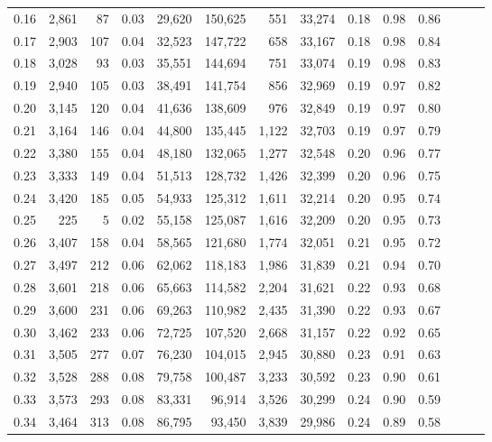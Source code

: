 \begin{tabular}{rrrrrrrrrrrrrr}
0.16 &  2,861 &   87 &  0.03 &   29,620 &  150,625 &     551 &  33,274 &  0.18 &  0.98 &      0.86 \\
0.17 &  2,903 &  107 &  0.04 &   32,523 &  147,722 &     658 &  33,167 &  0.18 &  0.98 &      0.84 \\
0.18 &  3,028 &   93 &  0.03 &   35,551 &  144,694 &     751 &  33,074 &  0.19 &  0.98 &      0.83 \\
0.19 &  2,940 &  105 &  0.03 &   38,491 &  141,754 &     856 &  32,969 &  0.19 &  0.97 &      0.82 \\
0.20 &  3,145 &  120 &  0.04 &   41,636 &  138,609 &     976 &  32,849 &  0.19 &  0.97 &      0.80 \\
0.21 &  3,164 &  146 &  0.04 &   44,800 &  135,445 &   1,122 &  32,703 &  0.19 &  0.97 &      0.79 \\
0.22 &  3,380 &  155 &  0.04 &   48,180 &  132,065 &   1,277 &  32,548 &  0.20 &  0.96 &      0.77 \\
0.23 &  3,333 &  149 &  0.04 &   51,513 &  128,732 &   1,426 &  32,399 &  0.20 &  0.96 &      0.75 \\
0.24 &  3,420 &  185 &  0.05 &   54,933 &  125,312 &   1,611 &  32,214 &  0.20 &  0.95 &      0.74 \\
0.25 &    225 &    5 &  0.02 &   55,158 &  125,087 &   1,616 &  32,209 &  0.20 &  0.95 &      0.73 \\
0.26 &  3,407 &  158 &  0.04 &   58,565 &  121,680 &   1,774 &  32,051 &  0.21 &  0.95 &      0.72 \\
0.27 &  3,497 &  212 &  0.06 &   62,062 &  118,183 &   1,986 &  31,839 &  0.21 &  0.94 &      0.70 \\
0.28 &  3,601 &  218 &  0.06 &   65,663 &  114,582 &   2,204 &  31,621 &  0.22 &  0.93 &      0.68 \\
0.29 &  3,600 &  231 &  0.06 &   69,263 &  110,982 &   2,435 &  31,390 &  0.22 &  0.93 &      0.67 \\
0.30 &  3,462 &  233 &  0.06 &   72,725 &  107,520 &   2,668 &  31,157 &  0.22 &  0.92 &      0.65 \\
0.31 &  3,505 &  277 &  0.07 &   76,230 &  104,015 &   2,945 &  30,880 &  0.23 &  0.91 &      0.63 \\
0.32 &  3,528 &  288 &  0.08 &   79,758 &  100,487 &   3,233 &  30,592 &  0.23 &  0.90 &      0.61 \\
0.33 &  3,573 &  293 &  0.08 &   83,331 &   96,914 &   3,526 &  30,299 &  0.24 &  0.90 &      0.59 \\
0.34 &  3,464 &  313 &  0.08 &   86,795 &   93,450 &   3,839 &  29,986 &  0.24 &  0.89 &      0.58 \\

\end{tabular}
